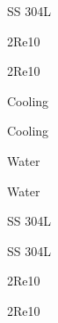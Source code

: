 \documentclass[a4paper,portrait,12pt]{article}
\begin{document}
\begin{flushleft}
SS 304L
\end{flushleft}





\begin{flushleft}
2Re10
\end{flushleft}





\begin{flushleft}
2Re10
\end{flushleft}





\begin{flushleft}
Cooling
\end{flushleft}





\begin{flushleft}
Cooling
\end{flushleft}





\begin{flushleft}
Water
\end{flushleft}





\begin{flushleft}
Water
\end{flushleft}





\begin{flushleft}
SS 304L
\end{flushleft}





\begin{flushleft}
SS 304L
\end{flushleft}





\begin{flushleft}
2Re10
\end{flushleft}





\begin{flushleft}
2Re10
\end{flushleft}
\end{document}
